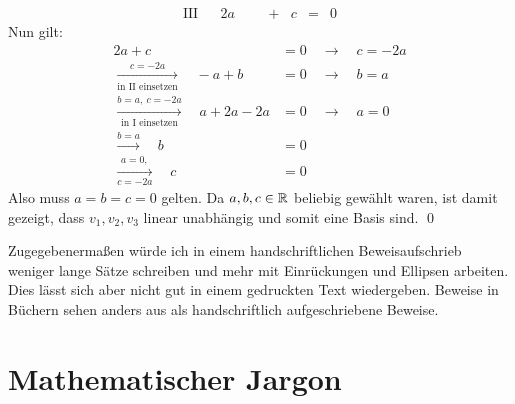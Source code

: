\begin{phasethree}[Aufschreiben]
\begin{bew}
\[\begin{array}{rcccccccc}
            \text{III} &&  2a && &+ &c & =& 0
        \end{array}\]
        Nun gilt:
        \begin{align*}
            2a+c&=0 \quad \to\quad c = -2a \\
            \xrightarrow[\text{in II einsetzen}]{c=-2a}\quad -a+b &=0 \quad\to\quad b=a \\[0.5em]
            \xrightarrow[\text{in I einsetzen}]{b=a,\ c=-2a} \quad a+2a-2a &= 0 \quad\to\quad a= 0 \\
            \xrightarrow{b=a}\quad b &= 0 \\
            \xrightarrow[c=-2a]{a=0,} \quad c &= 0
        \end{align*}
        Also muss $a=b=c=0$ gelten. Da $a,b,c\in \mathbb R$ beliebig gewählt waren, ist damit gezeigt, dass $v_1,v_2,v_3$ linear unabhängig und somit eine Basis sind. \qed
    \end{bew}
\end{phasethree}


Zugegebenermaßen würde ich in einem handschriftlichen Beweisaufschrieb weniger lange Sätze schreiben und mehr mit Einrückungen und Ellipsen arbeiten. Dies lässt sich aber nicht gut in einem gedruckten Text wiedergeben. Beweise in Büchern sehen anders aus als handschriftlich aufgeschriebene Beweise.





\chapter{Mathematischer Jargon}


